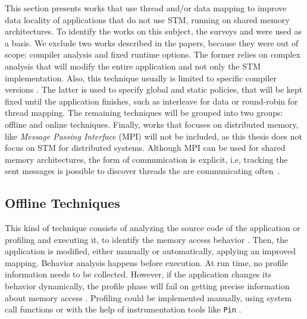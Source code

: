 This section presents works that use thread and/or data mapping to improve data locality of applications that do not use STM, running on shared memory architectures. To identify the works on this subject, the surveys \cite{Diener:2016Sur} and \cite{Cruz:2018} were used as a basis. We exclude two works described in the papers, because they were out of scope: compiler analysis and fixed runtime options. The former relies on complex analysis that will modify the entire application and not only the STM implementation. Also, this technique usually is limited to specific compiler versions \cite{Diener:2016Sur}. The latter is used to specify global and static policies, that will be kept fixed until the application finishes, such as interleave for data or round-robin for thread mapping. The remaining  techniques will be grouped into two groups: offline and online techniques. Finally, works that focuses on distributed memory, like \emph{Message Passing Interface} (MPI) will not be included, as this thesis does not focus on STM for distributed systems. Although MPI can be used for shared memory architectures, the form of communication is explicit, i.e, tracking the sent messages is possible to discover threads the are communicating often~\cite{Cruz:2018}.

\subsection{Offline Techniques}\label{sect:offlineTec}

This kind of technique consists of analyzing the source code of the application or profiling and executing it, to identify the memory access behavior \cite{Diener:2016Sur}. 
Then, the application is modified, either manually or automatically, applying an improved mapping.  Behavior analysis happens before execution. At run time, no profile information needs to be collected. However, if the application changes its behavior dynamically, the profile phase will fail on getting precise information about memory access \cite{Diener:2016Sur}. Profiling could be implemented manually, using system call functions or with the help of instrumentation tools like \texttt{Pin} \cite{Luk:2005}.

